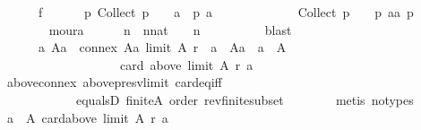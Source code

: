 \begin{isabellebody}
\ \ \ \ \ \ f{}{\isacharcolon}{\kern0pt}\isanewline
\ \ \ \ \ \ {\isachardoublequoteopen}{\isasymforall}p{\isachardot}{\kern0pt}\ {\isacharparenleft}{\kern0pt}Collect\ p\ {\isacharequal}{\kern0pt}\ {\isacharbraceleft}{\kern0pt}{\isacharbraceright}{\kern0pt}\ {\isasymlongrightarrow}\ {\isacharparenleft}{\kern0pt}{\isasymforall}a{\isachardot}{\kern0pt}\ {\isasymnot}\ p\ a{\isacharparenright}{\kern0pt}{\isacharparenright}{\kern0pt}\ {\isasymand}\isanewline
\ \ \ \ \ \ \ \ \ \ \ \ {\isacharparenleft}{\kern0pt}Collect\ p\ {\isasymnoteq}\ {\isacharbraceleft}{\kern0pt}{\isacharbraceright}{\kern0pt}\ {\isasymlongrightarrow}\ p\ {\isacharparenleft}{\kern0pt}aa\ p{\isacharparenright}{\kern0pt}{\isacharparenright}{\kern0pt}{\isachardoublequoteclose}\isanewline
\ \ \ \ \ \ \isamarkupfalse%
\ moura\isanewline
\ \ \ \ \isamarkupfalse%
\ {\isachardoublequoteopen}{\isasymforall}n{\isachardot}{\kern0pt}\ {\isasymnot}\ {\isacharparenleft}{\kern0pt}n{\isacharcolon}{\kern0pt}{\isacharcolon}{\kern0pt}nat{\isacharparenright}{\kern0pt}\ {\isasymle}\ {}\ {\isasymor}\ n\ {\isacharequal}{\kern0pt}\ {}{\isachardoublequoteclose}\isanewline
\ \ \ \ \ \ \isamarkupfalse%
\ blast\isanewline
\ \ \ \ \isamarkupfalse%
\isanewline
\ \ \ \ \ \ {\isachardoublequoteopen}{\isasymforall}a\ Aa{\isachardot}{\kern0pt}\ {\isasymnot}\ connex\ Aa\ {\isacharparenleft}{\kern0pt}limit\ A\ r{\isacharparenright}{\kern0pt}\ {\isasymor}\ a\ {\isasymnotin}\ Aa\ {\isasymor}\ a\ {\isasymnotin}\ A\ {\isasymor}\isanewline
\ \ \ \ \ \ \ \ \ \ \ \ \ \ \ \ \ \ {\isasymnot}\ card\ {\isacharparenleft}{\kern0pt}above\ {\isacharparenleft}{\kern0pt}limit\ A\ r{\isacharparenright}{\kern0pt}\ a{\isacharparenright}{\kern0pt}\ {\isasymle}\ {}{\isachardoublequoteclose}\isanewline
\ \ \ \ \ \ \isamarkupfalse%
\ above{\isacharunderscore}{\kern0pt}connex\ above{\isacharunderscore}{\kern0pt}presv{\isacharunderscore}{\kern0pt}limit\ card{\isacharunderscore}{\kern0pt}eq{\isacharunderscore}{\kern0pt}{}{\isacharunderscore}{\kern0pt}iff\isanewline
\ \ \ \ \ \ \ \ \ \ \ \ equals{}D\ finite{\isacharunderscore}{\kern0pt}A\ order\ rev{\isacharunderscore}{\kern0pt}finite{\isacharunderscore}{\kern0pt}subset\isanewline
\ \ \ \ \ \ \isamarkupfalse%
\ {\isacharparenleft}{\kern0pt}metis\ {\isacharparenleft}{\kern0pt}no{\isacharunderscore}{\kern0pt}types{\isacharparenright}{\kern0pt}{\isacharparenright}{\kern0pt}\isanewline
\ \ \ \ \isamarkupfalse%
\ {\isachardoublequoteopen}{\isacharbraceleft}{\kern0pt}a\ {\isasymin}\ A{\isachardot}{\kern0pt}\ card{\isacharparenleft}{\kern0pt}above\ {\isacharparenleft}{\kern0pt}limit\ A\ r{\isacharparenright}{\kern0pt}\ a{\isacharparenright}{\kern0pt}\ {\isasymle}\ {}{\isacharbraceright}{\kern0pt}\ {\isacharequal}{\kern0pt}\ {\isacharbraceleft}{\kern0pt}{\isacharbraceright}{\kern0pt}{\isachardoublequoteclose}\isanewline

\end{isabellebody}
